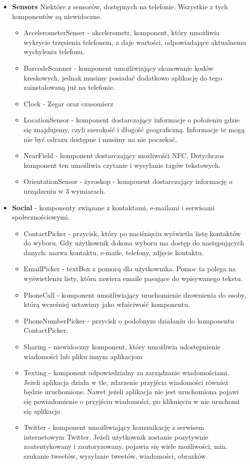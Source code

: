 \begin{itemize}
\item \textbf{Sensors} Niektóre z sensorów, dostępnych na telefonie. Wszystkie z tych komponentów są niewidoczne.
\begin{itemize}
\item AccelerometerSenser - akcelerometr, komponent, który umożliwia wykrycie trzęsienia telefonem, a daje wartości, odpowiadające aktualnemu wychyleniu telefonu.
\item BarcodeScanner - komponent umożliwiający skanowanie kodów kreskowych, jednak musimy posiadać dodatkowo aplikację do tego zainstalowaną już na telefonie.
\item Clock - Zegar oraz czasomierz
\item LocationSensor - komponent dostarczający informacje o położeniu gdzie się znajdujemy, czyli szerokość i długość geograficzną. Informacje te mogą nie być odrazu dostępne i musimy na nie poczekać.
\item NearField - komponent dostarczający możliwośći NFC. Dotychczas komponent ten umożliwia czytanie i wysyłanie tagów tekstowych.
\item OrientationSensor - żyroskop - komponent dostarczający informację o urządzeniu w 3 wymiarach.
\end{itemize}

\item \textbf{Social} - komponenty związane z kontaktami, e-mailami i serwisami społecznościowymi.
\begin{itemize}
\item ContactPicker - przycisk, który po naciśnięciu wyświetla listę kontaktów do wyboru. Gdy użytkownik dokona wyboru ma dostęp do następujących danych: nazwa kontaktu, e-maile, telefony, zdjęcie kontaktu.
\item EmailPicker - textBox z pomocą dla użytkownika. Pomoc ta polega na wyświetleniu listy, która zawiera emaile pasujące do wpisywanego tekstu.
\item PhoneCall - komponent umożliwiający uruchomienie dzownienia do osoby, którą wcześniej ustawimy jako właściwość komponentu.
\item PhoneNumberPicker - przycisk o podobnym działaniu do komponentu ContactPicker.
\item Sharing - niewidoczny komponent, który umożliwia udostępnienie wiadomości lub pliku innym aplikacjom
\item Texting - komponent odpowiedzialny za zarządzanie wiadomościami. Jeżeli aplikacja działa w tle, zdarzenie przyjścia wiadomości również będzie uruchomione. Nawet jeżeli aplikacja nie jest uruchomiona pojawi się powiadomienie o przyjściu wiadomości, po kliknięciu w nie uruchomi się aplikacja
\item Twitter - komponent umożliwiający komunikację z serwisem internetowym Twitter. Jeżeli użytkownik zostanie pozytywnie zautentykowany i zautoryzowany, pojawia się wiele możliwości, min. szukanie tweetów, wysyłanie tweetów, wiadomości, obrazków.
\end{itemize}


\end{itemize}
